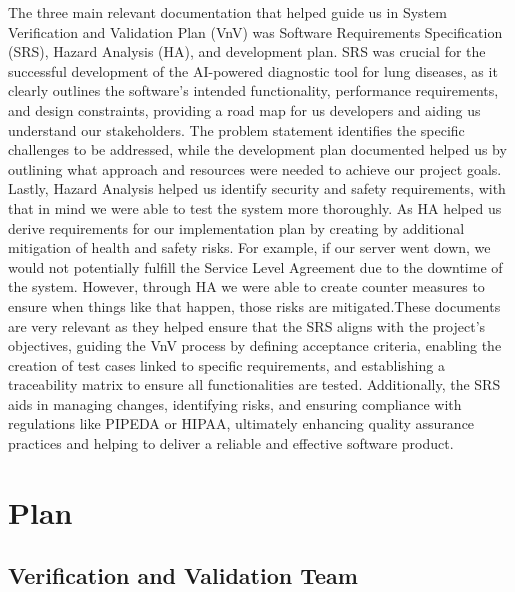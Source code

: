 \documentclass[12pt, titlepage]{article}
\begin{document}
The three main relevant documentation that helped guide us in System Verification and Validation Plan (VnV) was Software Requirements Specification (SRS), Hazard Analysis (HA), and development plan. SRS was crucial for the successful development of the AI-powered diagnostic tool for lung diseases, as it clearly outlines the software’s intended functionality, performance requirements, and design constraints, providing a road map for us developers and aiding us understand our stakeholders.  The problem statement identifies the specific challenges to be addressed, while the development plan documented helped us by outlining what approach and resources were needed to achieve our project goals. Lastly, Hazard Analysis helped us identify security and safety requirements, with that in mind we were able to test the system more thoroughly. As HA helped us derive requirements for our implementation plan by creating by additional mitigation of health and safety risks. For example, if our server went down, we would not potentially fulfill the Service Level Agreement due to the downtime of the system. However, through HA we were able to create counter measures to ensure when things like that happen, those risks are mitigated.These documents are very relevant as they helped ensure that the SRS aligns with the project’s objectives, guiding the VnV process by defining acceptance criteria, enabling the creation of test cases linked to specific requirements, and establishing a traceability matrix to ensure all functionalities are tested. Additionally, the SRS aids in managing changes, identifying risks, and ensuring compliance with regulations like PIPEDA or HIPAA, ultimately enhancing quality assurance practices and helping to deliver a reliable and effective software product.



\citet{SRS}


\section{Plan}


\subsection{Verification and Validation Team}
\end{document}
